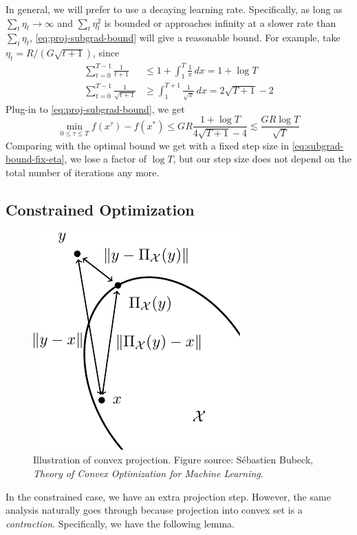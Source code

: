 \documentclass{scrartcl}
\begin{document}
In general, we will prefer to use a decaying learning rate. Specifically, as long as
$\sum_t\eta_t\rightarrow \infty$ and $\sum_t\eta_t^2$ is bounded or approaches infinity at a slower
rate than $\sum_t\eta_t$, \eqref{eq:proj-subgrad-bound} will give a reasonable bound. For example,
take $\eta_t=R/(G\sqrt{t+1})$, since
\[
\begin{aligned}
  \sum_{t=0}^{T-1} \frac{1}{t+1} &\leq 1 + \int_1^{T} \frac{1}{x}\,dx = 1 + \log T \\
  \sum_{t=0}^{T-1} \frac{1}{\sqrt{t+1}} &\geq \int_1^{T+1}\frac{1} {\sqrt{x}}\,dx =
  2\sqrt{T+1}-2
\end{aligned}
\]
Plug-in to \eqref{eq:proj-subgrad-bound}, we get
\begin{equation}
  \min_{0\leq \tau \leq T} f(x^\tau) - f(x^*)
  \leq GR \frac{1+\log T}{4\sqrt{T+1}-4} \lesssim \frac
  {GR\log T}{\sqrt{T}}
\end{equation}
Comparing with the optimal bound we get with a fixed step size in \eqref{eq:subgrad-bound-fix-eta},
we lose a factor of $\log T$, but our step size does not depend on the total number of iterations any
more.

\subsection{Constrained Optimization}

\begin{figure}
\centering
\includegraphics[width=.8\linewidth]{figs/convex-projection}
\caption{Illustration of convex projection. Figure source: S{\'e}bastien Bubeck, \emph{Theory of
Convex Optimization for Machine Learning}.}
\end{figure}
In the constrained case, we have an extra projection step. However, the same analysis naturally goes
through because projection into convex set is a \emph{contraction}. Specifically, we have the
following lemma.
\end{document}
